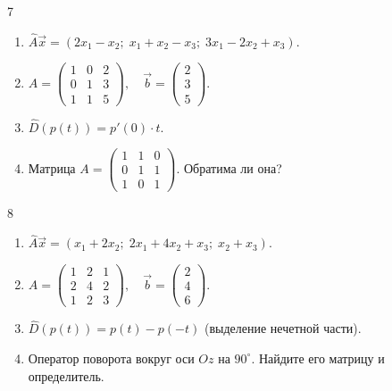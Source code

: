 \documentclass[12pt,a4paper]{article}
\theoremstyle{plain}
\theoremstyle{definition}
\begin{document}
\begin{taskbox}{7}
    \begin{enumerate}
        \item $\hat{A}\vec{x} = (2x_1 - x_2; \; x_1 + x_2 - x_3; \; 3x_1 - 2x_2 + x_3)$.
        \item $A = \begin{pmatrix} 1 & 0 & 2 \\ 0 & 1 & 3 \\ 1 & 1 & 5 \end{pmatrix}, \quad \vec{b} = \begin{pmatrix} 2 \\ 3 \\ 5 \end{pmatrix}$.
        \item $\hat{D}(p(t)) = p'(0) \cdot t$.
        \item Матрица $A = \begin{pmatrix} 1 & 1 & 0 \\ 0 & 1 & 1 \\ 1 & 0 & 1 \end{pmatrix}$. Обратима ли она?
    \end{enumerate}
\end{taskbox}

\begin{taskbox}{8}
    \begin{enumerate}
        \item $\hat{A}\vec{x} = (x_1 + 2x_2; \; 2x_1 + 4x_2 + x_3; \; x_2 + x_3)$.
        \item $A = \begin{pmatrix} 1 & 2 & 1 \\ 2 & 4 & 2 \\ 1 & 2 & 3 \end{pmatrix}, \quad \vec{b} = \begin{pmatrix} 2 \\ 4 \\ 6 \end{pmatrix}$.
        \item $\hat{D}(p(t)) = p(t) - p(-t)$ (выделение нечетной части).
        \item Оператор поворота вокруг оси $Oz$ на $90^\circ$. Найдите его матрицу и определитель.
    \end{enumerate}
\end{taskbox}
\end{document}
